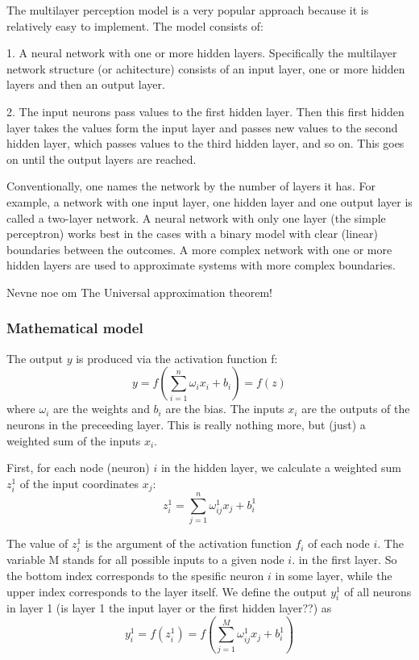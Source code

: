 \documentclass[a4paper,12pt]{article}
\begin{document}
The multilayer perception model is a very popular approach because it is relatively easy to implement. The model consists of:\newline

1. A neural network with one or more hidden layers. Specifically the multilayer network structure (or achitecture) consists of an input layer, one or more hidden layers and then an output layer.\newline

2. The input neurons pass values to the first hidden layer. Then this first hidden layer takes the values form the input layer and passes new values to the second hidden layer, which passes values to the third hidden layer, and so on. This goes on until the output layers are reached. \newline

Conventionally, one names the network by the number of layers it has. For example, a network with one input layer, one hidden layer and one output layer is called a two-layer network. A neural network with only one layer (the simple perceptron) works best in the cases with a binary model with clear (linear) boundaries between the outcomes. A more complex network with one or more hidden layers are used to approximate systems with more complex boundaries.

Nevne noe om The Universal approximation theorem!


\subsubsection{Mathematical model}
The output $y$ is produced via the activation function f:
\begin{equation}
    y = f( \sum_{i=1}^n{\omega_i x_i + b_i} ) = f(z)
\end{equation}
where $\omega_i$ are the weights and $b_i$ are the bias. The inputs $x_i$ are the outputs of the neurons in the preceeding layer.\newline
This is really nothing more, but (just) a weighted sum of the inputs $x_i$.\newline

First, for each node (neuron) $i$ in the hidden layer, we calculate a weighted sum $z_i^1$ of the input coordinates $x_j$:
\begin{equation}
    z_i^1 = \sum_{j=1}^n \omega_{ij}^1 x_j + b_i^1
\end{equation}

The value of $z_i^1$ is the argument of the activation function $f_i$ of each node $i$. The variable M stands for all possible inputs to a given node $i$. in the first layer. So the bottom index corresponds to the spesific neuron $i$ in some layer, while the upper index corresponds to the layer itself. We define the output $y_i^1$ of all neurons in layer 1 (is layer 1 the input layer or the first hidden layer??) as
\begin{equation}
    y_i^1 = f(z_i^1) = f( \sum_{j=1}^M \omega_{ij}^1 x_j + b_i^1 )
\end{equation}
\end{document}
